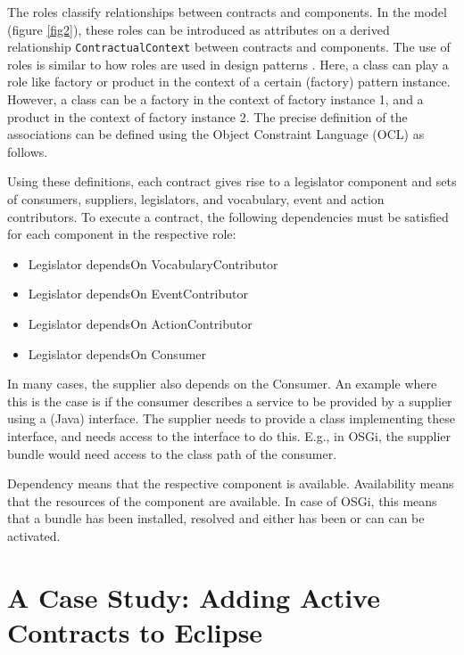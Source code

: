 \documentclass{llncs}
\begin{document}
The roles classify relationships between contracts and components. In the model (figure \ref{fig2}), these roles can be introduced as attributes on a derived relationship \texttt{ContractualContext} between contracts and components. The use of roles is similar to how roles are used in design patterns \cite{GangOf4}. Here, a class can play a role like factory or product in the context of a certain (factory) pattern instance. However, a class can be a factory in the context of factory instance 1, and a product in the context of factory instance 2. The precise definition of the associations can be defined using the Object Constraint Language (OCL) \cite{OCL20} as follows. 

\lstset{ language=OCL }


Using these definitions, each contract gives rise to a legislator component and sets of consumers, suppliers, legislators, and vocabulary, event and action contributors. To execute a contract, the following dependencies must be satisfied for each component in the respective role: 

\begin{itemize}
  \item Legislator dependsOn VocabularyContributor
  \item Legislator dependsOn EventContributor
  \item Legislator dependsOn ActionContributor
  \item Legislator dependsOn Consumer
\end{itemize}

In many cases, the supplier also depends on the Consumer. An example where this is the case is if the consumer describes a service to be provided by a supplier using a (Java) interface. The supplier needs to provide a class implementing these interface, and needs access to the interface to do this. E.g., in OSGi, the supplier bundle would need access to the class path of the consumer. 

Dependency means that the respective component is available. Availability means that the resources of the component are available. In case of OSGi, this means that a bundle has been installed, resolved and either has been or can can be activated. 



\section{A Case Study: Adding Active Contracts to Eclipse}
\end{document}
